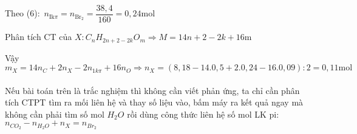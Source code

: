 \begin{vd}
{\begin{itemize}
			Theo (6)$\colon$ $n_{\mathrm{Ik} \pi}=n_{\mathrm{Br}_2}=\dfrac{38,4}{160}=0,24\mathrm{mol}$

			Phân tích CT của $X: C_n H_{2n+2-2k} O_m \Rightarrow M=14n+2-2k+16\mathrm{m}$

			Vậy $m_X=14n_C+2n_X-2n_{1k \pi}+16n_O \Rightarrow n_X=(8,18-14.0,5+2.0,24-16.0,09): 2=0,11\mathrm{mol}$
			\\\\%
			 Nếu bài toán trên là trắc nghiệm thì không cần viết phản ứng, ta chỉ cần phân tích CTPT tìm ra mối liên hệ và thay số liệu vào, bấm máy ra kết quả ngay mà không cần phải tìm số mol $H_2O$ rồi dùng công thức liên hệ số mol LK pi: $n_{CO_2}-n_{H_2O}+n_X=n_{{Br}_2}$
		\end{itemize}
	}
\end{vd}

